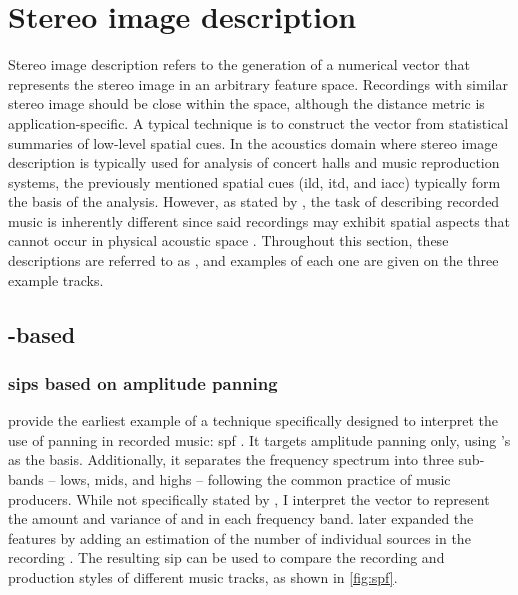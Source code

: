 \pagebreak

\section{Stereo image description}
\label{sec:stereo_image_description}

Stereo image description refers to the generation of a numerical vector that represents the stereo image in an arbitrary feature space. Recordings with similar stereo image should be close within the space, although the distance metric is application-specific. A typical technique is to construct the vector from statistical summaries of low-level spatial cues. In the acoustics domain where stereo image description is typically used for analysis of concert halls and music reproduction systems, the previously mentioned spatial cues (\gls{ild}, \gls{itd}, and \gls{iacc}) typically form the basis of the analysis. However, as stated by \citeauthor{sarroffComputationalModelPerceived2011}, the task of describing recorded music is inherently different since said recordings may exhibit spatial aspects that cannot occur in physical acoustic space \cite{sarroffComputationalModelPerceived2011}. Throughout this section, these descriptions are referred to as , and examples of each one are given on the three example tracks.


\subsection{-based }

\subsubsection*{\glspl{sip} based on amplitude panning}

\citeauthor{tzanetakisStereoPanningFeatures2007} provide the earliest example of a technique specifically designed to interpret the use of panning in recorded music: \gls{spf} \cite{tzanetakisStereoPanningFeatures2007}. It targets amplitude panning only, using \citeauthor{avendanoFrequencyDomainTechniques2002}'s \pani{} as the basis. Additionally, it separates the frequency spectrum into three sub-bands -- lows, mids, and highs -- following the common practice of music producers. While not specifically stated by \citeauthor{tzanetakisStereoPanningFeatures2007}, I interpret the vector to represent the amount and variance of  and  in each frequency band. \citeauthor{tzanetakisStereoPanningInformation2010} later expanded the features by adding an estimation of the number of individual sources in the recording \cite{tzanetakisStereoPanningInformation2010}. The resulting \gls{sip} can be used to compare the recording and production styles of different music tracks, as shown in \cref{fig:spf}.

